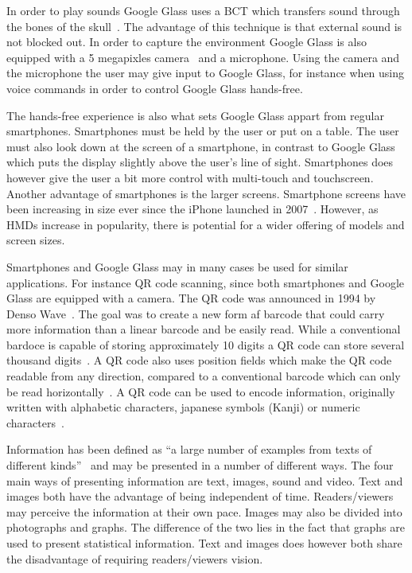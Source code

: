 In order to play sounds Google Glass uses a BCT which transfers sound through the bones of the skull~\cite{GlassSpecs}. The advantage of this technique is that external sound is not blocked out. In order to capture the environment Google Glass is also equipped with a 5 megapixles camera~\cite{GlassSpecs} and a microphone. Using the camera and the microphone the user may give input to Google Glass, for instance when using voice commands in order to control Google Glass hands-free.

The hands-free experience is also what sets Google Glass appart from regular smartphones. Smartphones must be held by the user or put on a table. The user must also look down at the screen of a smartphone, in contrast to Google Glass which puts the display slightly above the user's line of sight. Smartphones does however give the user a bit more control with multi-touch and touchscreen. Another advantage of smartphones is the larger screens. Smartphone screens have been increasing in size ever since the iPhone launched in 2007~\cite{smartphoneSizeChart2}. However, as HMDs increase in popularity, there is potential for a wider offering of models and screen sizes.

Smartphones and Google Glass may in many cases be used for similar applications. For instance QR code scanning, since both smartphones and Google Glass are equipped with a camera. The QR code was announced in 1994 by Denso Wave~\cite{qrCodeHistory}. The goal was to create a new form af barcode that could carry more information than a linear barcode and be easily read. While a conventional bardoce is capable of storing approximately 10 digits a QR code can store several thousand digits~\cite{qrCodeType}. A QR code also uses position fields which make the QR code readable from any direction, compared to a conventional barcode which can only be read horizontally~\cite{qrCodeAbout}. A QR code can be used to encode information, originally written with alphabetic characters, japanese symbols (Kanji) or numeric characters~\cite{qrCodeVersion}. 

Information has been defined as ``a large number of examples from texts of different kinds''~\cite{informationDef1} and may be presented in a number of different ways. The four main ways of presenting information are text, images, sound and video. Text and images both have the advantage of being independent of time. Readers/viewers may perceive the information at their own pace. Images may also be divided into photographs and graphs. The difference of the two lies in the fact that graphs are used to present statistical information. Text and images does however both share the disadvantage of requiring readers/viewers vision.

